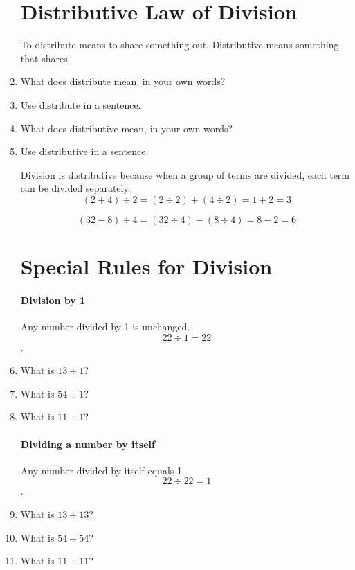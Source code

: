 \documentclass[12pt]{article}
\begin{document}
\begin{enumerate}
\section*{Distributive Law of Division}
To distribute means to share something out. Distributive means something that shares.\\

\item What does distribute mean, in your own words?
\item Use distribute in a sentence.
\item What does distributive mean, in your own words?
\item Use distributive in a sentence.

Division is distributive because when a group of terms are divided, each term can be divided separately.\\

$$(2 + 4) \div 2 = (2 \div 2) + (4 \div 2) = 1+2 = 3$$

$$(32-8) \div 4 = (32 \div 4) -(8 \div 4) = 8-2=6$$

\section*{Special Rules for Division}

\paragraph{Division by 1}
Any number divided by 1 is unchanged.\\

$$22 \div 1 = 22$$.

\item What is $13 \div 1$?
\item What is $54 \div 1$?
\item What is $11 \div 1$?

\paragraph{Dividing a number by itself}
Any number divided by itself equals 1.\\

$$22 \div 22 = 1$$.

\item What is $13 \div 13$?
\item What is $54 \div 54$?
\item What is $11 \div 11$?


\end{enumerate}
\end{document}
